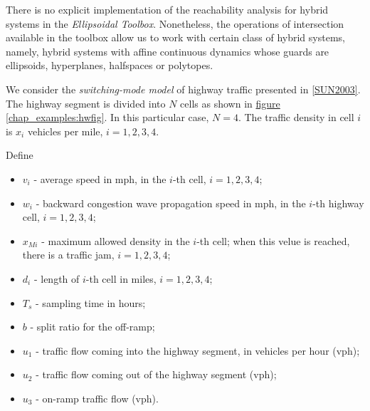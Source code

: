 \documentclass[letterpaper,10pt,english]{sphinxmanual}
\begin{document}
There is no explicit implementation of the reachability analysis for
hybrid systems in the \emph{Ellipsoidal Toolbox}. Nonetheless, the operations
of intersection available in the toolbox allow us to work with certain
class of hybrid systems, namely, hybrid systems with affine continuous
dynamics whose guards are ellipsoids, hyperplanes, halfspaces or
polytopes.

We consider the \emph{switching-mode model} of highway traffic presented in
{\hyperref[chap_examples:sun2003]{{[}SUN2003{]}}}. The highway segment is divided into $N$
cells as shown in \hyperref[chap_examples:hwfig]{figure  \ref*{chap_examples:hwfig}}. In this particular case, $N=4$.
The traffic density in cell $i$ is $x_i$ vehicles per mile,
$i=1,2,3,4$.

Define
\begin{itemize}
\item {} 
$v_i$ - average speed in mph, in the $i$-th cell,
$i=1,2,3,4$;

\item {} 
$w_i$ - backward congestion wave propagation speed in mph, in
the $i$-th highway cell, $i=1,2,3,4$;

\item {} 
$x_{Mi}$ - maximum allowed density in the $i$-th cell;
when this velue is reached, there is a traffic jam,
$i=1,2,3,4$;

\item {} 
$d_i$ - length of $i$-th cell in miles,
$i=1,2,3,4$;

\item {} 
$T_s$ - sampling time in hours;

\item {} 
$b$ - split ratio for the off-ramp;

\item {} 
$u_1$ - traffic flow coming into the highway segment, in
vehicles per hour (vph);

\item {} 
$u_2$ - traffic flow coming out of the highway segment (vph);

\item {} 
$u_3$ - on-ramp traffic flow (vph).

\end{itemize}
\end{document}
